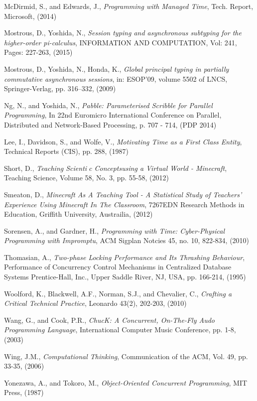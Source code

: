 \documentclass[11pt, abstracton, twoside, titlepage=true]{scrartcl}
\begin{document}
\begin{thebibliography}{9}
  McDirmid, S., and Edwards, J.,
  \emph{Programming with Managed Time},
  Tech. Report, Microsoft,
  (2014)

  Mostrous, D., Yoshida, N., 
  \emph{Session typing and asynchronous subtyping for the higher-order pi-calculus}, 
  INFORMATION AND COMPUTATION, Vol: 241, 
  Pages: 227-263,
  (2015)

  Mostrous, D., Yoshida, N., Honda, K., 
  \emph{Global principal typing in partially
  commutative asynchronous sessions},
  in: ESOP’09, volume 5502 of
  LNCS, 
  Springer-Verlag, 
  pp. 316–332,
  (2009)

  Ng, N., and Yoshida, N.,
  \emph{Pabble: Parameterised Scribble for Parallel Programming},
  In 22nd Euromicro International Conference on Parallel, Distributed and Network-Based Processing, 
  p. 707 - 714,
  (PDP 2014)

  Lee, I., Davidson, S., and Wolfe, V.,
  \emph{Motivating Time as a First Class Entity},
  Technical Reports (CIS),
  pp. 288,
  (1987)

  Short, D.,
  \emph{Teaching Scientic Conceptsusing a Virtual World - Minecraft},
  Teaching Science,
  Volume 58, No. 3,
  pp. 55-58,
  (2012)

  Smeaton, D.,
  \emph{Minecraft As A Teaching Tool - A Statistical Study of Teachers' Experience Using Minecraft In The Classroom},
  7267EDN Research Methods in Education,
  Griffith University, Austrailia,
  (2012)

  Sorensen, A., and Gardner, H.,
  \emph{Programming with Time: Cyber-Physical Programming with Impromptu},
  ACM Sigplan Notcies 45,
  no. 10, 822-834,
  (2010)

  Thomasian, A.,
  \emph{Two-phase Locking Performance and Its Thrashing Behaviour},
  Performance of Concurrency Control Mechanisms in Centralized Database Systems
  Prentice-Hall, Inc.,
  Upper Saddle River, NJ, USA,
  pp. 166-214,
  (1995)

  Woolford, K., Blackwell, A.F., Norman, S.J., and Chevalier, C.,
  \emph{Crafting a Critical Technical Practice},
  Leonardo 43(2),
  202-203,
  (2010)

  Wang, G., and Cook, P.R.,
  \emph{ChucK: A Concurrent, On-The-Fly Audo Programming Language},
  International Computer Music Conference,
  pp. 1-8,
  (2003)

  Wing, J.M.,
  \emph{Computational Thinking},
  Communication of the ACM,
  Vol. 49, pp. 33-35,
  (2006)

  Yonezawa, A., and Tokoro, M.,
  \emph{Object-Oriented Concurrent Programming},
  MIT Press,
  (1987)

\end{thebibliography}
\end{document}
